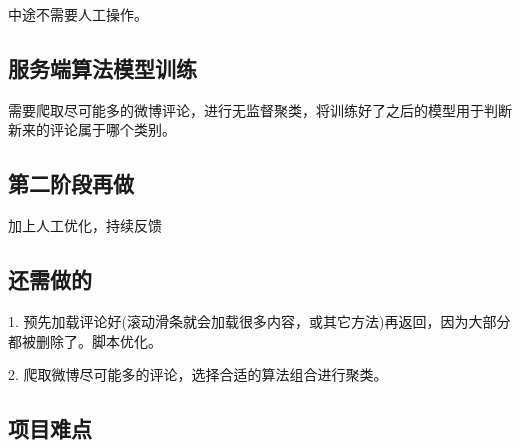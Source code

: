 \documentclass[UTF8]{ctexart}
\begin{document}
中途不需要人工操作。

\subsection{服务端算法模型训练}
需要爬取尽可能多的微博评论，进行无监督聚类，将训练好了之后的模型用于判断新来的评论属于哪个类别。

\subsection {第二阶段再做}
加上人工优化，持续反馈

\subsection {还需做的}
1. 预先加载评论好(滚动滑条就会加载很多内容，或其它方法)再返回，因为大部分都被删除了。脚本优化。

2. 爬取微博尽可能多的评论，选择合适的算法组合进行聚类。
\subsection {项目难点}




\end{document}
